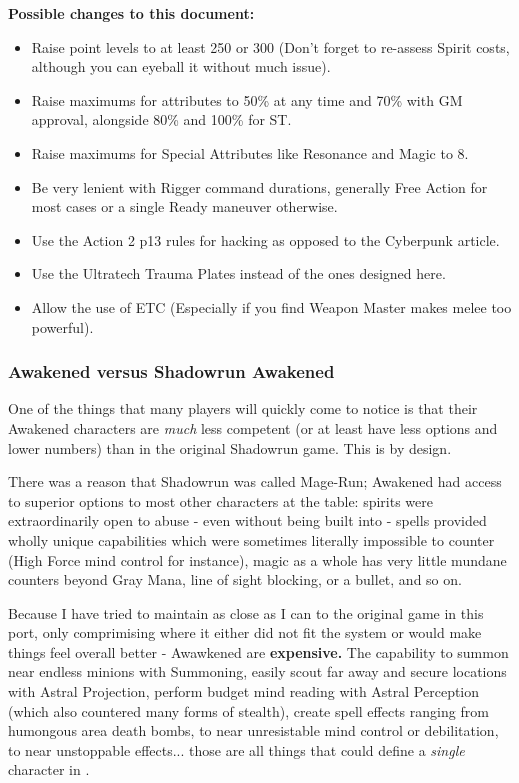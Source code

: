 \begin{multicols}{2}
	\textbf{Possible changes to this document:}
	\begin{itemize}
		\itemsep 0pt
		\item Raise point levels to at least 250 or 300 (Don't forget to re-assess Spirit costs, although you can eyeball it without much issue). 
		\item Raise maximums for attributes to 50\% at any time and 70\% with GM approval, alongside 80\% and 100\% for ST.
		\item Raise maximums for Special Attributes like Resonance and Magic to 8.
		\item Be very lenient with Rigger command durations, generally Free Action for most cases or a single Ready maneuver otherwise.
		\item Use the Action 2 p13 rules for hacking as opposed to the Cyberpunk article.
		\item Use the Ultratech Trauma Plates instead of the ones designed here.
		\item Allow the use of ETC (Especially if you find Weapon Master makes melee too powerful).
	\end{itemize}
	
	\subsubsection{\GURPS Awakened versus Shadowrun Awakened}\label{gurps_awakened}
	
	One of the things that many players will quickly come to notice is that their Awakened characters are \textit{much} less competent (or at least have less options and lower numbers) than in the original Shadowrun game. This is by design. 
	
	There was a reason that Shadowrun was called Mage-Run; Awakened had access to superior options to most other characters at the table: spirits were extraordinarily open to abuse - even without being built into - spells provided wholly unique capabilities which were sometimes literally impossible to counter (High Force mind control for instance), magic as a whole has very little mundane counters beyond Gray Mana, line of sight blocking, or a bullet, and so on.
	
	Because I have tried to maintain as close as I can to the original game in this port, only comprimising where it either did not fit the \GURPS system or would make things feel overall better - Awawkened are \textbf{expensive.} The capability to summon near endless minions with Summoning, easily scout far away and secure locations with Astral Projection, perform budget mind reading with Astral Perception (which also countered many forms of stealth), create spell effects ranging from humongous area death bombs, to near unresistable mind control or debilitation, to near unstoppable effects... those are all things that could define a \textit{single} character in \GURPS.
	

\end{multicols}
